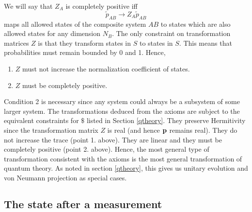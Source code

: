 \documentclass[10pt,twocolumn]{article}
\begin{document}
We will say that $Z_A$ is completely positive iff
\begin{equation}\label{ZPZ}
\tilde{p}_{AB} \rightarrow Z_A \tilde{p}_{AB}
\end{equation}
maps all allowed states of the composite system $AB$ to states
which are also allowed states for any dimension $N_B$.
The only constraint on transformation matrices $Z$ is that they
transform states in $S$ to states in $S$.  This means that probabilities
must remain bounded by 0 and 1.  Hence,
\begin{enumerate}
\item $Z$ must not increase the normalization coefficient of states.
\item $Z$ must be completely positive.
\end{enumerate}
Condition 2 is necessary since any system could always be a subsystem of
some larger system. The transformations deduced from the axioms are
subject to the equivalent constraints for $\$ $ listed in Section
\ref{qtheory}.  They preserve Hermitivity since the transformation
matrix $Z$ is real (and hence ${\bf p}$ remains real).
They do not increase the trace (point 1. above).
They are linear and they must be completely positive (point 2. above).
Hence, the most general type of transformation consistent with the
axioms is the most general transformation of quantum theory.  As noted
in section \ref{qtheory}, this gives us unitary evolution and von
Neumann projection as special cases.

\subsection{The state after a measurement}
\end{document}
